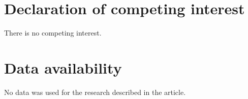 \documentclass{amsart}
\numberwithin{equation}{section}
\begin{document}
\section*{Declaration of competing interest}
\label{Three}

\noindent
There is no competing interest.


\section*{Data availability}
\label{Four}

\noindent
No data was used for the research described in the article.

















%
\end{document}
